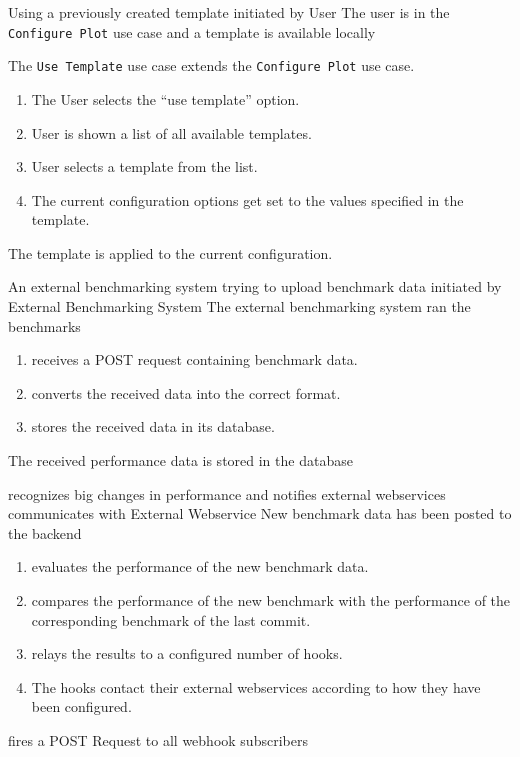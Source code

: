 {Using a previously created template}
{initiated by User}
{The user is in the \texttt{Configure Plot} use case and a \gls{template} is available locally}
{The \texttt{Use Template} use case extends the \texttt{Configure Plot} use case.
\begin{enumerate}
    \item The User selects the \enquote{use template} option.
    \item User is shown a list of all available \glspl{template}.
    \item User selects a \gls{template} from the list.
    \item The current \gls{configuration} options get set to the values specified in the template.
\end{enumerate}}
{The \gls{template} is applied to the current configuration.}

\bigskip

{An external benchmarking system trying to upload benchmark data}
{initiated by External Benchmarking System}
{The external benchmarking system ran the benchmarks}
{\begin{enumerate}
    \item \parkview{} receives a POST request containing benchmark data.
    \item \parkview{} converts the received data into the correct format.
    \item \parkview{} stores the received data in its database.
\end{enumerate}}
{The received performance data is stored in the database}

\bigskip

{\parkview{} recognizes big changes in performance and notifies external webservices}
{communicates with External Webservice}
{New benchmark data has been posted to the backend}
{\begin{enumerate}
    \item \parkview{} evaluates the performance of the new benchmark data.
    \item \parkview{} compares the performance of the new benchmark with the performance of the corresponding benchmark of the last commit.
    \item \parkview{} relays the results to a configured number of hooks.
    \item The hooks contact their external webservices according to how they have been configured.
\end{enumerate}}
{\parkview{} fires a POST Request to all webhook subscribers}

